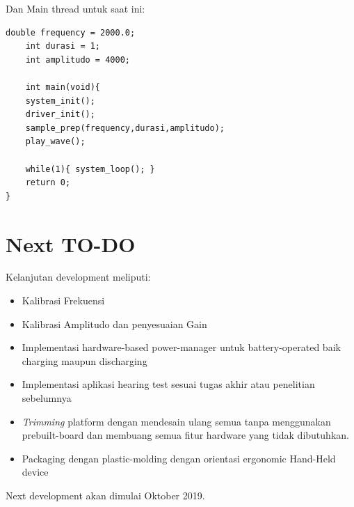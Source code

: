 \documentclass[12pt,]{article}
\begin{document}
	Dan Main thread untuk saat ini:
	\begin{verbatim}
double frequency = 2000.0;
	int durasi = 1;
	int amplitudo = 4000;
	
	int main(void){
	system_init();
	driver_init();
	sample_prep(frequency,durasi,amplitudo);
	play_wave();
	
	while(1){ system_loop(); }
	return 0;
}
	\end{verbatim}
	
	\newpage
	\section{Next TO-DO}
	Kelanjutan development meliputi:
	\begin{itemize}
		\item Kalibrasi Frekuensi
		\item Kalibrasi Amplitudo dan penyesuaian Gain
		\item Implementasi hardware-based power-manager untuk battery-operated baik charging maupun discharging
		\item Implementasi aplikasi hearing test sesuai tugas akhir atau penelitian sebelumnya
		\item \textit{Trimming} platform dengan mendesain ulang semua tanpa menggunakan prebuilt-board
		dan membuang semua fitur hardware yang tidak dibutuhkan.
		\item Packaging dengan plastic-molding dengan orientasi ergonomic Hand-Held device
	\end{itemize}

	Next development akan dimulai Oktober 2019.
\end{document}
